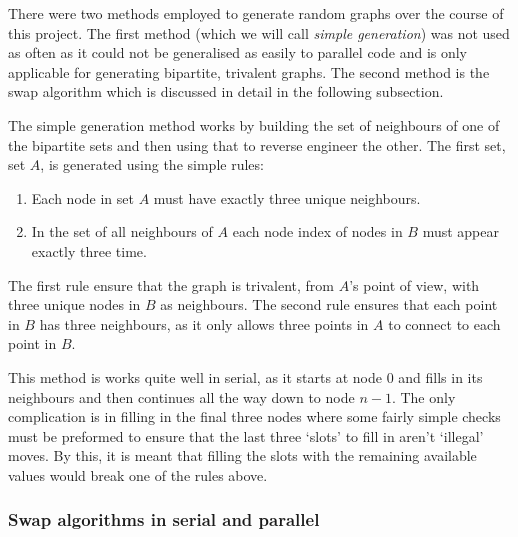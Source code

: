 \documentclass[pdftex,12pt,a4paper]{article}
\begin{document}
There were two methods employed to generate random graphs over the course of this project. The first method (which we will call \emph{simple generation}) was not used as often as it could not be generalised as easily to parallel code and is only applicable for generating bipartite, trivalent graphs. The second method is the swap algorithm which is discussed in detail in the following subsection.

The simple generation method works by building the set of neighbours of one of the bipartite sets and then using that to reverse engineer the other. The first set, set $A$, is generated using the simple rules:

\begin{enumerate}
\item Each node in set $A$ must have exactly three unique neighbours.
\item In the set of all neighbours of $A$ each node index of nodes in $B$ must appear exactly three time.
\end{enumerate}

The first rule ensure that the graph is trivalent, from $A$'s point of view, with three unique nodes in $B$ as neighbours. The second rule ensures that each point in $B$ has three neighbours, as it only allows three points in $A$ to connect to each point in $B$.

This method is works quite well in serial, as it starts at node $0$ and fills in its neighbours and then continues all the way down to node $n-1$. The only complication is in filling in the final three nodes where some fairly simple checks must be preformed to ensure that the last three `slots' to fill in aren't `illegal' moves. By this, it is meant that filling the slots with the remaining available values would break one of the rules above.

\subsubsection{Swap algorithms in serial and parallel}
\end{document}
